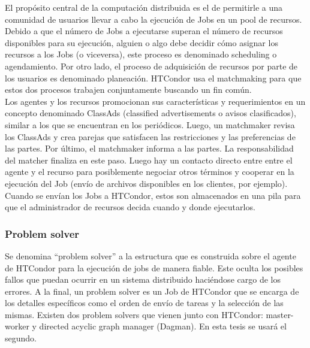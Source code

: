 El propósito central de la computación distribuida es el de permitirle a una comunidad de usuarios llevar a cabo la ejecución de Jobs en un pool de recursos. Debido a que el número de Jobs a ejecutarse superan el número de recursos disponibles para su ejecución, alguien o algo debe decidir cómo asignar los recursos a los Jobs (o viceversa), este proceso es denominado scheduling o agendamiento. Por otro lado, el proceso de adquisición de recursos por parte de los usuarios es denominado planeación. HTCondor usa el matchmaking para que estos dos procesos trabajen conjuntamente buscando un fin común.\\

Los agentes y los recursos promocionan sus características y requerimientos en un concepto denominado ClassAds (classified advertisements o avisos clasificados), similar a los que se encuentran en los periódicos. Luego, un matchmaker revisa los ClassAds y crea parejas que satisfacen las restricciones y las preferencias de las partes. Por último, el matchmaker informa a las partes. La responsabilidad del matcher finaliza en este paso. Luego hay un contacto directo entre entre el agente y el recurso para posiblemente negociar otros términos y cooperar en la ejecución del Job (envío de archivos disponibles en los clientes, por ejemplo). Cuando se envían los Jobs a HTCondor, estos son almacenados en una pila para que el administrador de recursos decida cuando y donde ejecutarlos.

\subsubsection{Problem solver}
Se denomina “problem solver” a la estructura que es construida sobre el agente de HTCondor para la ejecución de jobs de manera fiable. Este oculta los posibles fallos que puedan ocurrir en un sistema distribuido haciéndose cargo de los errores. A la final, un problem solver es un Job de HTCondor que se encarga de los detalles específicos como el orden de envío de tareas y la selección de las mismas. Existen dos problem solvers que vienen junto con HTCondor\cite{wforescience:2007}: master-worker y directed acyclic graph manager (Dagman). En esta tesis se usará el segundo.
